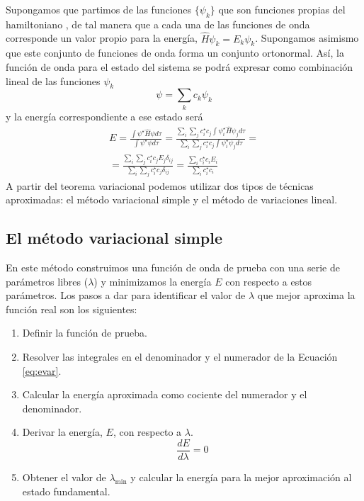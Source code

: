 Supongamos que partimos de las funciones $\{\psi_k\}$
que son funciones propias del hamiltoniano , de tal manera que
a cada una de las funciones de onda corresponde un valor propio
para la energía,
$\hat{H}\psi_k=E_k\psi_k$. Supongamos asimismo que este conjunto
de funciones de onda forma un conjunto ortonormal. Así, la función
de onda para el estado del sistema se podrá expresar como
combinación lineal de las funciones $\psi_k$
\begin{equation}
    \psi=\sum_kc_k\psi_k
\end{equation}
y la energía correspondiente a ese estado será
\begin{equation}\begin{split}
    E=\frac{\int{\psi^\star\hat{H}\psi d\tau}}{\int{\psi^\star \psi d\tau}}=  
    \frac{\sum_i\sum_jc_i^\star c_j\int{\psi_i^\star\hat{H}\psi_j d\tau}}{\sum_i\sum_jc_i^\star c_j\int{\psi_i^\star\psi_j d\tau}}= \\
 = \frac{\sum_i\sum_jc_i^\star c_jE_{j}\delta_{ij}}{\sum_i\sum_jc_i^\star c_j\delta_{ij}}=
    \frac{\sum_ic_i^\star c_iE_{i}}{\sum_ic_i^\star c_i}
\end{split}
\end{equation}
A partir del teorema variacional podemos utilizar dos tipos
de técnicas aproximadas: el método variacional simple y el 
método de variaciones lineal.

\subsection{El método variacional simple}
En este método construimos una función de onda de prueba con 
una serie de parámetros libres ($\lambda$) y minimizamos la
energía $E$ con respecto a estos parámetros. Los pasos a dar
para identificar el valor de $\lambda$ que mejor aproxima
la función real son los siguientes:
\begin{enumerate}
    \item Definir la función de prueba.
    \item Resolver las integrales en el denominador y el numerador de la Ecuación \ref{eq:evar}.
    \item Calcular la energía aproximada como cociente del
    numerador y el denominador.
    \item Derivar la energía, $E$, con respecto a $\lambda$.
    \begin{equation}
        \frac{dE}{d\lambda} = 0  
    \end{equation}
    \item Obtener el valor de $\lambda_\mathrm{min}$ y calcular la energía para la mejor aproximación al
    estado fundamental.
\end{enumerate}


